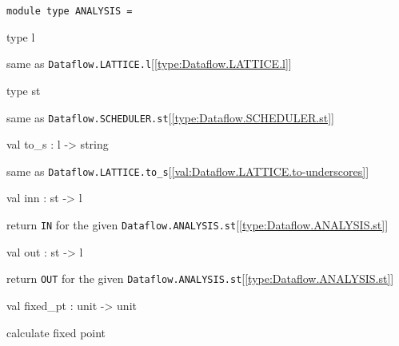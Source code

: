 \documentclass[11pt]{article}
\begin{document}
\begin{ocamldoccode}
{\tt{module type }}{\tt{ANALYSIS}}{\tt{ = }}\end{ocamldoccode}
\label{moduletype:Dataflow.ANALYSIS}

\begin{ocamldocsigend}


\label{type:Dataflow.ANALYSIS.l}\begin{ocamldoccode}
type l 
\end{ocamldoccode}
\begin{ocamldocdescription}
same as {\tt{Dataflow.LATTICE.l}}[\ref{type:Dataflow.LATTICE.l}]


\end{ocamldocdescription}


\label{type:Dataflow.ANALYSIS.st}\begin{ocamldoccode}
type st 
\end{ocamldoccode}
\begin{ocamldocdescription}
same as {\tt{Dataflow.SCHEDULER.st}}[\ref{type:Dataflow.SCHEDULER.st}]


\end{ocamldocdescription}


\label{val:Dataflow.ANALYSIS.to-underscores}\begin{ocamldoccode}
val to_s : l -> string
\end{ocamldoccode}
\begin{ocamldocdescription}
same as {\tt{Dataflow.LATTICE.to\_s}}[\ref{val:Dataflow.LATTICE.to-underscores}]


\end{ocamldocdescription}


\label{val:Dataflow.ANALYSIS.inn}\begin{ocamldoccode}
val inn : st -> l
\end{ocamldoccode}
\begin{ocamldocdescription}
return {\tt{IN}} for the given {\tt{Dataflow.ANALYSIS.st}}[\ref{type:Dataflow.ANALYSIS.st}]


\end{ocamldocdescription}


\label{val:Dataflow.ANALYSIS.out}\begin{ocamldoccode}
val out : st -> l
\end{ocamldoccode}
\begin{ocamldocdescription}
return {\tt{OUT}} for the given {\tt{Dataflow.ANALYSIS.st}}[\ref{type:Dataflow.ANALYSIS.st}]


\end{ocamldocdescription}


\label{val:Dataflow.ANALYSIS.fixed-underscorept}\begin{ocamldoccode}
val fixed_pt : unit -> unit
\end{ocamldoccode}
\begin{ocamldocdescription}
calculate fixed point


\end{ocamldocdescription}
\end{ocamldocsigend}
\end{document}
